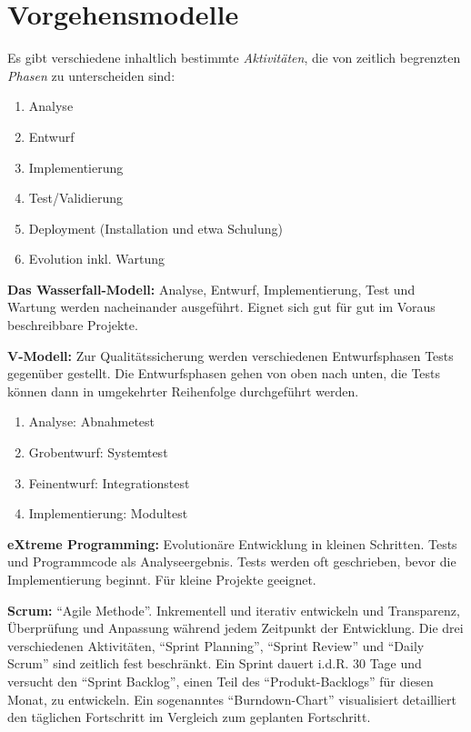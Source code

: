 \documentclass{panikzettel}
\begin{document}
\section{Vorgehensmodelle}
\label{sec:vorgehensmodelle}

Es gibt verschiedene inhaltlich bestimmte \emph{Aktivitäten}, die von zeitlich begrenzten \emph{Phasen} zu unterscheiden sind:

\begin{enumerate}
  \item Analyse
  \item Entwurf
  \item Implementierung
  \item Test/Validierung
  \item Deployment (Installation und etwa Schulung)
  \item Evolution inkl. Wartung
\end{enumerate}

\textbf{Das Wasserfall-Modell:} Analyse, Entwurf, Implementierung, Test und Wartung werden nacheinander ausgeführt.
Eignet sich gut für gut im Voraus beschreibbare Projekte.

\textbf{V-Modell:} Zur Qualitätssicherung werden verschiedenen Entwurfsphasen Tests gegenüber gestellt.
Die Entwurfsphasen gehen von oben nach unten, die Tests können dann in umgekehrter Reihenfolge durchgeführt werden.
\begin{enumerate}
  \item Analyse: Abnahmetest
  \item Grobentwurf: Systemtest
  \item Feinentwurf: Integrationstest
  \item Implementierung: Modultest
\end{enumerate}

\textbf{eXtreme Programming:} Evolutionäre Entwicklung in kleinen Schritten.
Tests und Programmcode als Analyseergebnis.
Tests werden oft geschrieben, bevor die Implementierung beginnt.
Für kleine Projekte geeignet.

\textbf{Scrum:} ``Agile Methode''. Inkrementell und iterativ entwickeln und Transparenz, Überprüfung und Anpassung während jedem Zeitpunkt der Entwicklung.
Die drei verschiedenen Aktivitäten, ``Sprint Planning'', ``Sprint Review'' und ``Daily Scrum'' sind zeitlich fest beschränkt.
Ein Sprint dauert i.d.R. 30 Tage und versucht den ``Sprint Backlog'', einen Teil des ``Produkt-Backlogs'' für diesen Monat, zu entwickeln.
Ein sogenanntes ``Burndown-Chart'' visualisiert detailliert den täglichen Fortschritt im Vergleich zum geplanten Fortschritt.
\end{document}
